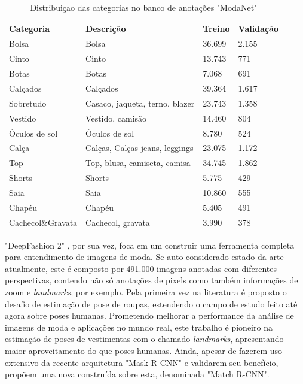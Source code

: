 \documentclass[12pt]{report}
\begin{document}
\begin{table}[]
\centering
\begin{tabular}{@{}llll@{}}
\toprule
Categoria         & Descrição                      & Treino & Validação \\ \midrule
Bolsa             & Bolsa                          & 36.699 & 2.155     \\
Cinto             & Cinto                          & 13.743 & 771       \\
Botas             & Botas                          & 7.068  & 691       \\
Calçados          & Calçados                       & 39.364 & 1.617     \\
Sobretudo         & Casaco, jaqueta, terno, blazer & 23.743 & 1.358     \\
Vestido           & Vestido, camisão               & 14.460 & 804       \\
Óculos de sol     & Óculos de sol                  & 8.780  & 524       \\
Calça             & Calças, Calças jeans, leggings & 23.075 & 1.172     \\
Top               & Top, blusa, camiseta, camisa   & 34.745 & 1.862     \\
Shorts            & Shorts                         & 5.775  & 429       \\
Saia              & Saia                           & 10.860 & 555       \\
Chapéu            & Chapéu                         & 5.405  & 491       \\
Cachecol\&Gravata & Cachecol, gravata              & 3.990  & 378       \\ \bottomrule
\end{tabular}
\caption{Distribuiçao das categorias no banco de anotações "ModaNet"}
\label{table:estat}
\end{table}

"DeepFashion 2" \cite{deepfashion2}, por sua vez, foca em um construir uma ferramenta completa para entendimento de imagens de moda. Se auto considerado estado da arte atualmente, este é composto por 491.000 imagens anotadas com diferentes perspectivas, contendo não só anotações de pixels como também informações de zoom e \textit{landmarks}, por exemplo. Pela primeira vez na literatura é proposto o desafio de estimação de pose de roupas, estendendo o campo de estudo feito até agora sobre poses humanas. Prometendo melhorar a performance da análise de imagens de moda e aplicações no mundo real, este trabalho é pioneiro na estimação de poses de vestimentas com o chamado \textit{landmarks}, apresentando maior aproveitamento do que poses humanas. Ainda, apesar de fazerem uso extensivo da recente arquitetura "Mask R-CNN" e validarem seu benefício, propõem uma nova construída sobre esta, denominada "Match R-CNN". 
\end{document}
